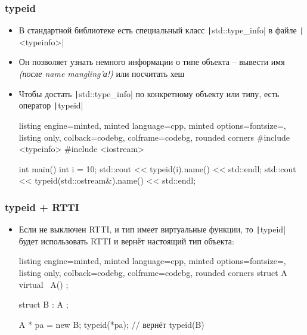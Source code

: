 \documentclass[10pt]{beamer}
\begin{document}
\begin{frame}[fragile]
\frametitle{typeid}
\begin{itemize}
\item В стандартной библиотеке есть специальный класс \texttt|std::type_info| в файле \texttt|<typeinfo>|
\pause
\item Он позволяет узнать немного информации о типе объекта -- вывести имя \textit{(после name mangling'а!)} или посчитать хеш
\pause
\item Чтобы достать \texttt|std::type_info| по конкретному объекту или типу, есть оператор \texttt|typeid|
\pause
{}
\begin{tcblisting}{listing engine=minted, minted language=cpp, minted options={fontsize=\scriptsize}, listing only, colback=codebg, colframe=codebg, rounded corners}
#include <typeinfo>
#include <iostream>

int main() {
  int i = 10;
  std::cout << typeid(i).name() << std::endl;
  std::cout << typeid(std::ostream&).name() << std::endl;
}
\end{tcblisting}
\end{itemize}
\end{frame}

\begin{frame}[fragile]
\frametitle{typeid + RTTI}
\begin{itemize}
\item Если не выключен RTTI, и тип имеет виртуальные функции, то \texttt|typeid| будет использовать RTTI и вернёт настоящий тип объекта:
\begin{tcblisting}{listing engine=minted, minted language=cpp, minted options={fontsize=\scriptsize}, listing only, colback=codebg, colframe=codebg, rounded corners}
struct A {
  virtual ~A() {}
};

struct B : A {};

A * pa = new B;
typeid(*pa); // вернёт typeid(B)
\end{tcblisting}
\end{itemize}
\end{frame}
\end{document}
